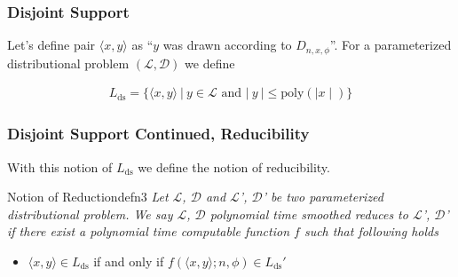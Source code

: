 
\begin{frame}
    \frametitle{Disjoint Support}

    Let's define pair $\langle x, y \rangle$ as ``$y$ was drawn according to
    $D_{n,x,\phi}$''. For a parameterized distributional problem $(\mathcal{L},
        \mathcal{D})$ we define

    \begin{align*}
        L_{\text{ds}} = \{\langle x, y \rangle \: \vert \: y \in \mathcal{L} \text{ and } \vert \: y \: \vert \leq \text{poly}(\mid x\mid)\}
    \end{align*}

\end{frame}

\begin{frame}
    \frametitle{Disjoint Support Continued, Reducibility}

    With this notion of $L_{\text{ds}}$ we define the notion of reducibility.

    \begin{define}{Notion of Reduction}{defn3}
        \textit{Let $\mathcal{L}$, $\mathcal{D}$ and $\mathcal{L}$', $\mathcal{D}$' be
            two parameterized distributional problem. We say $\mathcal{L}$, $\mathcal{D}$
            polynomial time smoothed reduces to $\mathcal{L}$', $\mathcal{D}$' if there exist
            a polynomial time computable function $f$ such that following holds}

    \end{define}

    \begin{itemize}
        \item $\langle x, y \rangle \in L_{\text{ds}}$ if and only if $f(\langle x, y \rangle; n, \phi) \in L_{\text{ds}}'$
    \end{itemize}

\end{frame}

